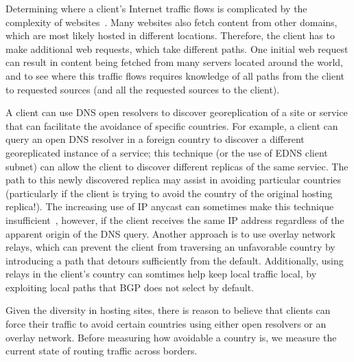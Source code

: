 Determining where a client's Internet traffic flows is complicated by
the complexity of websites~\cite{butkiewicz2011understanding}.  Many
websites also fetch content from other domains, which are most likely
hosted in different locations.  Therefore, the client has to make
additional web requests, which take different paths.  One initial web
request can result in content being fetched from many servers located
around the world, and to see where this traffic flows requires knowledge
of all paths from the client to requested sources (and all the requested
sources to the client).  

A client can use DNS open resolvers to discover georeplication of a site
or service that can facilitate the avoidance of specific countries. For
example, a client can query an open DNS resolver in a foreign country to
discover a different georeplicated instance of a service; this technique
(or the use of EDNS client subnet) can allow the client to discover
different replicas of the same serviec. The path to this newly
discovered replica may assist in avoiding particular countries
(particularly if the client is trying to avoid the country of the
original hosting replica!).  The increasing use of IP anycast can
sometimes make this technique
insufficient~\cite{cicalese2015characterizing}, however, if the client
receives the same IP address regardless of the apparent origin of the
DNS query.  Another approach is to use overlay network relays, which can
prevent the client from traversing an unfavorable country by introducing
a path that detours sufficiently from the default. Additionally, using
relays in the client's country can somtimes help keep local traffic
local, by exploiting local paths that BGP does not select by default.


Given the diversity in hosting sites, there is reason to believe that
clients can force their traffic to avoid certain countries using either
open resolvers or an overlay network.  Before measuring how avoidable a
country is, we measure the current state of routing traffic across
borders.  

